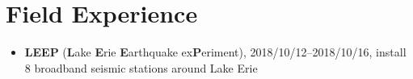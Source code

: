 \section{Field Experience}

\begin{itemize}
\item \textbf{LEEP} (\textbf{L}ake \textbf{E}rie \textbf{E}arthquake ex\textbf{P}eriment),
      2018/10/12--2018/10/16, install 8 broadband seismic stations around Lake Erie
\end{itemize}

